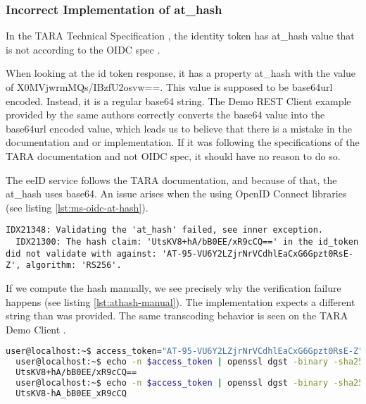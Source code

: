 \subsubsection{Incorrect Implementation of at\_hash}

In the TARA Technical Specification \cite{tara-technical}, the identity token has at\_hash value that is not according to the OIDC spec \cite{oidc}.

When looking at the id token response, it has a property at\_hash with the value of {X0MVjwrmMQs/IBzfU2osvw==}. This value is supposed to be base64url encoded. Instead, it is a regular base64 string. The Demo REST Client example provided by the same authors \cite{tara-demorest} correctly converts the base64 value into the base64url encoded value, which leads us to believe that there is a mistake in the documentation and or implementation. If it was following the specifications of the TARA documentation and not OIDC spec, it should have no reason to do so.

The eeID service follows the TARA documentation, and because of that, the at\_hash uses base64. An issue arises when the using OpenID Connect libraries (see listing \ref{lst:ms-oidc-at-hash}).

\begin{lstlisting}[caption={Microsoft.IdentityModel.Protocols.OpenIdConnect fails to validate at\_hash}, label={lst:ms-oidc-at-hash}]
  IDX21348: Validating the 'at_hash' failed, see inner exception.
  IDX21300: The hash claim: 'UtsKV8+hA/bB0EE/xR9cCQ==' in the id_token did not validate with against: 'AT-95-VU6Y2LZjrNrVCdhlEaCxG6Gpzt0RsE-Z', algorithm: 'RS256'.
\end{lstlisting}

If we compute the hash manually, we see precisely why the verification failure happens (see listing \ref{lst:athash-manual}). The implementation expects a different string than was provided. The same transcoding behavior is seen on the TARA Demo Client \cite{tara-demorest}.

\begin{lstlisting}[caption={Verifying at\_hash manually}, label={lst:athash-manual}, language={bash}]
  user@localhost:~$ access_token="AT-95-VU6Y2LZjrNrVCdhlEaCxG6Gpzt0RsE-Z"
  user@localhost:~$ echo -n $access_token | openssl dgst -binary -sha256 | head -c 16 | base64
  UtsKV8+hA/bB0EE/xR9cCQ==
  user@localhost:~$ echo -n $access_token | openssl dgst -binary -sha256 | head -c 16 | base64 | tr '/+' '_-' | tr -d '='
  UtsKV8-hA_bB0EE_xR9cCQ
\end{lstlisting}

